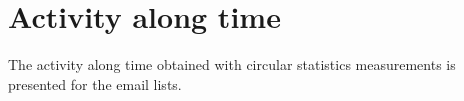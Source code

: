 \documentclass[%
	aip,
	jmp,%
	amsmath,amssymb,
	reprint,%
	floatfix,
]{revtex4-1}
\begin{document}


							\date{\today}%


\maketitle

							\section{Activity along time}\label{sec:time}

							The activity along time obtained with circular statistics measurements is presented for the email lists. 
\end{document}
